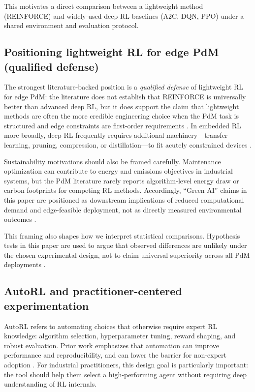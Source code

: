 \documentclass[11pt]{article}
\begin{document}
This motivates a direct comparison between a lightweight method (REINFORCE) and widely-used deep RL baselines (A2C, DQN, PPO) under a shared environment and evaluation protocol.

\subsection{Positioning lightweight RL for edge PdM (qualified defense)}
The strongest literature-backed position is a \emph{qualified defense} of lightweight RL for edge PdM: the literature does not establish that REINFORCE is universally better than advanced deep RL, but it does support the claim that lightweight methods are often the more credible engineering choice when the PdM task is structured and edge constraints are first-order requirements \parencite{Compare2020IoT, Njor2024TinyML, Pandey2023EdgeDNN}. In embedded RL more broadly, deep RL frequently requires additional machinery---transfer learning, pruning, compression, or distillation---to fit acutely constrained devices \parencite{Jang2020KnowledgeTransfer, Szydlo2022TinyRL, Xu2022ISORC}.

Sustainability motivations should also be framed carefully. Maintenance optimization can contribute to energy and emissions objectives in industrial systems, but the PdM literature rarely reports algorithm-level energy draw or carbon footprints for competing RL methods. Accordingly, ``Green AI'' claims in this paper are positioned as downstream implications of reduced computational demand and edge-feasible deployment, not as directly measured environmental outcomes \parencite{Banyai2021Energies, Banyai2022Sustainability, JasiulewiczKaczmarek2024Maintenance40}.

This framing also shapes how we interpret statistical comparisons. Hypothesis tests in this paper are used to argue that observed differences are unlikely under the chosen experimental design, not to claim universal superiority across all PdM deployments \parencite{Zhang2024}.

\subsection{AutoRL and practitioner-centered experimentation}
AutoRL refers to automating choices that otherwise require expert RL knowledge: algorithm selection, hyperparameter tuning, reward shaping, and robust evaluation. Prior work emphasizes that automation can improve performance and reproducibility, and can lower the barrier for non-expert adoption \parencite{Faust2019EvolvingRewards, Mussi2023ARLO}. For industrial practitioners, this design goal is particularly important: the tool should help them select a high-performing agent without requiring deep understanding of RL internals.
\end{document}
